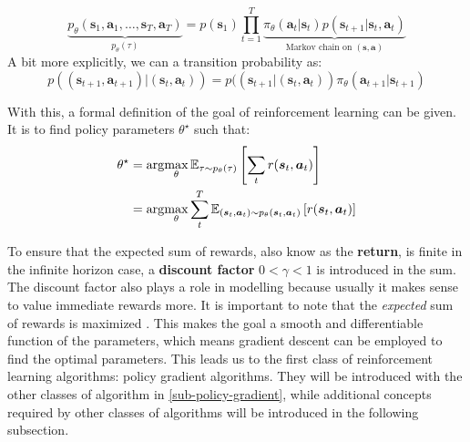 \begin{equation}
\underbrace{p_\theta(\bm{s}_1, \bm{a}_1, \dots, \bm{s}_T, \bm{a}_T)}_{p_\theta(\tau)} = p(\bm{s}_1) \prod^{T}_{t=1} 
\underbrace{\pi_{\theta} (\bm{a}_t | \bm{s}_t) p (\bm{s}_{t+1} | \bm{s}_t, \bm{a}_t)}_{\text{Markov chain on } (\bm{s}, \bm{a})}
\end{equation}
A bit more explicitly, we can a transition probability as:
\begin{equation}
p((\bm{s}_{t+1}, \bm{a}_{t+1}) | (\bm{s}_t, \bm{a}_t)) = 
p((\bm{s}_{t+1}| (\bm{s}_t, \bm{a}_t)) \pi_\theta (\bm{a}_{t+1} | \bm{s}_{t+1})
\end{equation}

With this, a formal definition of the goal of reinforcement learning can be given.
It is to find policy parameters $ \theta^{ \star }  $ such that:
\begin{align}
		\theta^\star &= \arg\!\max_{\theta} \mathbb{E}_{\tau \sim p_\theta(\tau)} \left[ \sum_{t}^{} r(\bm{s}_t, \bm{a}_t) \right] \\
	 &= \arg\!\max_{\theta} \sum_{t}^{T} \mathbb{E}_{(\bm{s}_t, \bm{a}_t) \sim p_\theta(\bm{s}_t, \bm{a}_t)} \left[  r(\bm{s}_t, \bm{a}_t) \right]
\end{align}

To ensure that the expected sum of rewards, also know as the \textbf{return},
is finite in the infinite horizon case, a
\textbf{discount factor} $ 0 < \gamma < 1  $ is introduced in the sum.
The discount factor also plays a role in modelling 
because usually it makes sense to value immediate rewards
more.
It is important to note that the \textit{expected} sum of
rewards is maximized . This makes the goal a smooth and differentiable function of the parameters,
which means gradient descent can be employed to find the optimal parameters.
This leads us to the first class of reinforcement learning algorithms:
policy gradient algorithms.
They will be introduced with the other classes of algorithm in \ref{sub-policy-gradient},
while additional concepts required by other classes of algorithms will be introduced 
in the following subsection.

